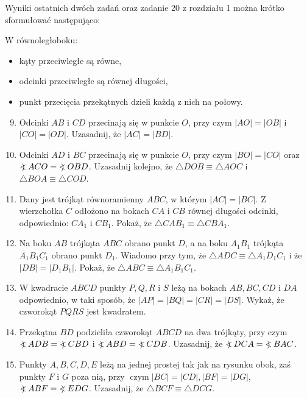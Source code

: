 \documentclass[10pt]{article}
\newcommand\Varangle{\mathop{{<\!\!\!\!\!\text{\small)}}\:}\nolimits}
\begin{document}
Wyniki ostatnich dwóch zadań oraz zadanie 20 z rozdziału 1 można krótko sformułować następująco:

W równoległoboku:

\begin{itemize}
  \item kąty przeciwległe są równe,
  \item odcinki przeciwległe są równej długości,
  \item punkt przecięcia przekątnych dzieli każdą z nich na połowy.
\end{itemize}

\begin{enumerate}
  \setcounter{enumi}{8}
  \item Odcinki \(A B\) i \(C D\) przecinają się w punkcie \(O\), przy czym \(|A O|=|O B|\) i \(|C O|=|O D|\). Uzasadnij, że \(|A C|=|B D|\).
  \item Odcinki \(A D\) i \(B C\) przecinają się w punkcie \(O\), przy czym \(|B O|=|C O|\) oraz \(\Varangle A C O=\Varangle O B D\). Uzasadnij kolejno, że \(\triangle D O B \equiv \triangle A O C\) i \(\triangle B O A \equiv \triangle C O D\).
  \item Dany jest trójkąt równoramienny \(A B C\), w którym \(|A C|=|B C|\). Z wierzchołka \(C\) odłożono na bokach \(C A\) i \(C B\) równej długości odcinki, odpowiednio: \(C A_{1}\) i \(C B_{1}\). Pokaż, że \(\triangle C A B_{1} \equiv \triangle C B A_{1}\).
  \item Na boku \(A B\) trójkąta \(A B C\) obrano punkt \(D\), a na boku \(A_{1} B_{1}\) trójkąta \(A_{1} B_{1} C_{1}\) obrano punkt \(D_{1}\). Wiadomo przy tym, że \(\triangle A D C \equiv \triangle A_{1} D_{1} C_{1}\) i że \(|D B|=\left|D_{1} B_{1}\right|\). Pokaż, że \(\triangle A B C \equiv \triangle A_{1} B_{1} C_{1}\).
  \item W kwadracie \(A B C D\) punkty \(P, Q, R\) i \(S\) leżą na bokach \(A B, B C, C D\) i \(D A\) odpowiednio, w taki sposób, że \(|A P|=|B Q|=|C R|=|D S|\). Wykaż, że czworokąt \(P Q R S\) jest kwadratem.
  \item Przekątna \(B D\) podzieliła czworokąt \(A B C D\) na dwa trójkąty, przy czym \(\Varangle A D B=\Varangle C B D\) i \(\Varangle A B D=\Varangle C D B\). Uzasadnij, że \(\Varangle D C A=\Varangle B A C\).
  \item Punkty \(A, B, C, D, E\) leżą na jednej prostej tak jak na rysunku obok, zaś punkty \(F\) i \(G\) poza nią, przy \(\operatorname{czym}|B C|=|C D|,|B F|=|D G|\), \(\Varangle A B F=\Varangle E D G\). Uzasadnij, że \(\triangle B C F \equiv \triangle D C G\).\\

\end{enumerate}
\end{document}
